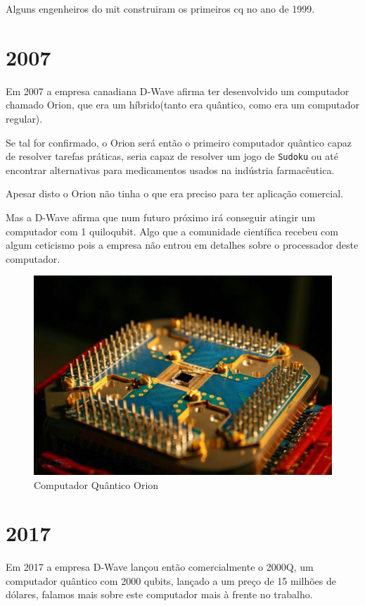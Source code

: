 \documentclass{report}
\begin{document}
	Alguns engenheiros do \ac{mit}  construiram os primeiros \ac{cq} no ano de 1999.

\section{2007}

	Em 2007 a  empresa canadiana D-Wave afirma ter desenvolvido um computador chamado Orion, que era um híbrido(tanto era quântico, como era um computador regular).

	Se tal for confirmado, o Orion será então o primeiro computador quântico capaz de resolver tarefas práticas, seria capaz de resolver um jogo de \verb/Sudoku/ ou até encontrar alternativas para medicamentos usados na indústria farmacêutica.

	Apesar disto o Orion não tinha o que era preciso para ter aplicação comercial.

	Mas a D-Wave afirma que num futuro próximo irá conseguir atingir um computador com 1 quiloqubit. Algo que a comunidade científica recebeu com algum ceticismo pois a empresa não entrou em detalhes sobre o processador deste computador.

	\begin{figure}[!h]
		\centering
		\includegraphics[scale=0.17]{Orion.jpg}
		\caption{Computador Quântico Orion}
		\label{Orion}
	\end{figure}

\section{2017}

	Em 2017 a empresa D-Wave lançou então comercialmente o 2000Q, um computador quântico com 2000 qubits, lançado a um preço de 15 milhões de dólares, falamos mais sobre este computador mais à frente no trabalho.
\end{document}

